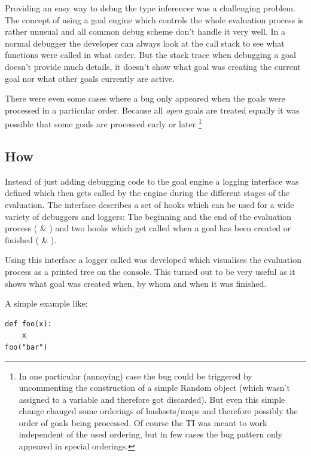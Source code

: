 \documentclass[12pt,halfparskip,DIV11,BCOR10mm]{scrreprt}
\begin{document}
Providing an easy way to debug the type inferencer was a challenging problem. The concept of using a goal engine which controls the whole evaluation process is rather unusual and all common debug scheme don't handle it very well. In a normal debugger the developer can always look at the call stack to see what functions were called in what order. But the stack trace when debugging a goal doesn't provide much details, it doesn't show what goal was creating the current goal nor what other goals currently are active.

There were even some cases where a bug only appeared when the goals were processed in a particular order. Because all \emph{open} goals are treated equally it was possible that some goals are processed early or later
\footnote{In one particular (annoying) case the bug could be triggered by uncommenting the construction of a simple Random object (which wasn't assigned to a variable and therefore got discarded). But even this simple change changed some orderings of hashsets/maps and therefore possibly the order of goals being processed. Of course the TI was meant to work independent of the used ordering, but in few cases the bug pattern only appeared in special orderings.}

\subsection{How}


Instead of just adding debugging code to the goal engine a logging interface was defined which then gets called by the engine during the different stages of the evaluation. The interface  describes a set of hooks which can be used for a wide variety of debuggers and loggers: The beginning and the end of the evaluation process ( \& ) and two hooks which get called when a goal has been created or finished ( \& ).

Using this interface a logger called  was developed which visualises the evaluation process as a printed tree on the console. This turned out to be very useful as it shows what goal was created when, by whom and when it was finished. 

A simple example like:
\begin{lstlisting}
def foo(x):
    x
foo("bar")
\end{lstlisting}
\end{document}

